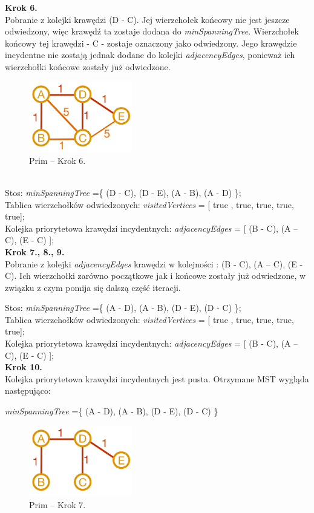 \textbf{Krok 6.}\\
Pobranie z kolejki krawędzi (D - C). Jej wierzchołek końcowy nie jest jeszcze odwiedzony, więc krawędź ta zostaje dodana do \emph{minSpanningTree}. Wierzchołek końcowy tej krawędzi - C - zostaje oznaczony jako odwiedzony. Jego krawędzie incydentne nie zostają jednak dodane do kolejki \emph{adjacencyEdges}, ponieważ ich wierzchołki końcowe zostały już odwiedzone.
\begin{figure}[htb!]
	\centering
	\includegraphics[width=0.4\textwidth]{tex/fig/graf6}
	\caption{Prim -- Krok 6.}
	\label{fig: g6}
\end{figure}\\
Stos: \emph{minSpanningTree} =\{ (D - C), (D - E), (A - B), (A - D) \};\\
Tablica wierzchołków odwiedzonych: \emph{visitedVertices} = [ true , true, true, true, true];\\
Kolejka priorytetowa krawędzi incydentnych: \emph{adjacencyEdges} = [ (B - C), (A -- C), (E - C) ];\\

\newpage
\textbf{Krok 7., 8., 9.}\\
Pobranie z kolejki  \emph{adjacencyEdges} krawędzi w kolejności : (B - C), (A -- C), (E - C). Ich wierzchołki zarówno początkowe jak i końcowe zostały już odwiedzone, w związku z czym pomija się dalszą część iteracji. 

Stos: \emph{minSpanningTree} =\{ (A - D), (A - B), (D - E), (D - C) \};\\
Tablica wierzchołków odwiedzonych: \emph{visitedVertices} = [ true , true, true, true, true];\\
Kolejka priorytetowa krawędzi incydentnych: \emph{adjacencyEdges} = [ (B - C), (A -- C), (E - C) ];\\

\textbf{Krok 10.}\\
Kolejka priorytetowa krawędzi incydentnych jest pusta. Otrzymane MST wygląda następująco: \\
\begin{center}
	\emph{minSpanningTree} =\{ (A - D), (A - B), (D - E), (D - C) \}
\end{center}

\begin{figure}[htb!]
	\centering
	\includegraphics[width=0.4\textwidth]{tex/fig/graf7}
	\caption{Prim -- Krok 7.}
	\label{fig: g7}
\end{figure}
\newpage